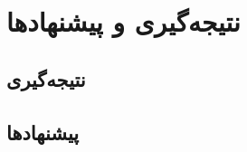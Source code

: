 
\chapter{نتیجه‌گیری و پیشنهادها}
 
\section{نتیجه‌گیری}

\section{پیشنهاد‌ها}
\label{sec:FutureWorks}

